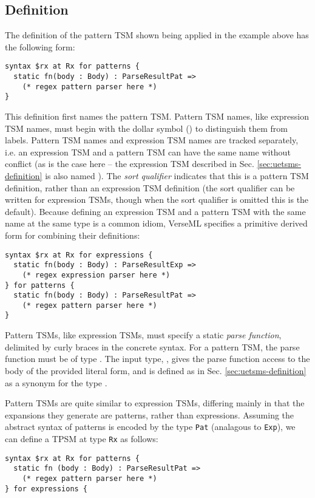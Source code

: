 {\subsection{Definition}\label{sec:ptsms-definition}
The definition of the pattern TSM  shown being applied in the example above has the following form:
\begin{lstlisting}[numbers=none]
syntax $rx at Rx for patterns {
  static fn(body : Body) : ParseResultPat => 
    (* regex pattern parser here *)
}
\end{lstlisting}
This definition first names the pattern TSM. Pattern TSM names, like expression TSM names, must begin with the dollar symbol (\li{#\dolla#}) to distinguish them from labels. Pattern TSM names and expression TSM names are tracked separately, i.e. an expression TSM and a pattern TSM can have the same name without conflict (as is the case here -- the expression TSM described in Sec. \ref{sec:uetsms-definition} is also named ). The \emph{sort qualifier}  indicates that this is a pattern TSM definition, rather than an expression TSM definition (the sort qualifier  can be written for expression TSMs, though when the sort qualifier is omitted this is the default). Because defining an expression TSM and a pattern TSM with the same name at the same type is a common idiom, VerseML specifies a primitive derived form for combining their definitions:
\begin{lstlisting}[numbers=none]
syntax $rx at Rx for expressions {
  static fn(body : Body) : ParseResultExp => 
    (* regex expression parser here *)
} for patterns {
  static fn(body : Body) : ParseResultPat => 
    (* regex pattern parser here *)
}
\end{lstlisting}
Pattern TSMs, like expression TSMs, must specify a static \emph{parse function}, delimited by curly braces in the concrete syntax. For a pattern TSM, the parse function must be of type . The input type, , gives the parse function access to the body of the provided literal form, and is defined as in Sec. \ref{sec:uetsms-definition} as a synonym for the type .

Pattern TSMs are quite similar to expression TSMs, differing mainly in that the expansions they generate are patterns, rather than expressions. Assuming the abstract syntax of patterns is encoded by the type \lstinline{Pat} (analagous to \lstinline{Exp}), we can define a TPSM at type \lstinline{Rx} as follows:
\begin{lstlisting}[numbers=none]
syntax $rx at Rx for patterns {
  static fn (body : Body) : ParseResultPat => 
    (* regex pattern parser here *)
} for expressions {


\end{lstlisting}}
